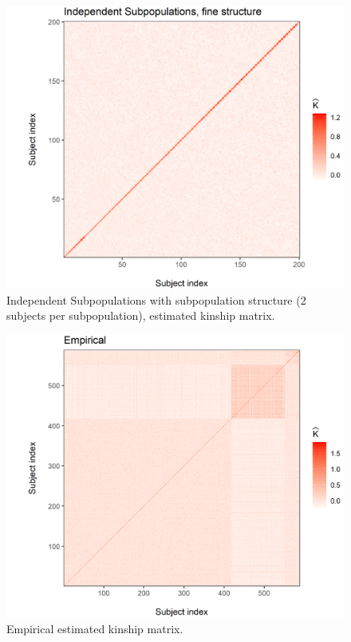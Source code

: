 \begin{figure}[H]
    \centering
    \includegraphics[scale = 1]{figures/indep_fine_kinship.png}
    \caption{Independent Subpopulations with subpopulation structure (2 subjects per subpopulation), estimated kinship matrix.}
    \label{fig:indep_fine}
\end{figure}

\begin{figure}[H]
    \centering
    \includegraphics[scale = 1]{figures/empirical_kinship.png}
    \caption{Empirical estimated kinship matrix.}
    \label{fig:empirical}
\end{figure}

